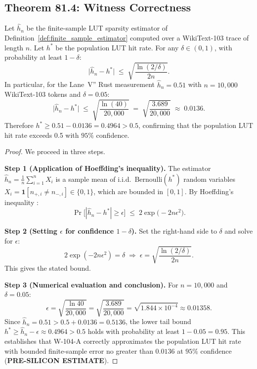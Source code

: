 \subsection{Theorem 81.4: Witness Correctness}

\begin{theorem}
\label{thm:witness_correctness_104a}
Let $\hat{h}_n$ be the finite-sample LUT sparsity estimator of
Definition~\ref{def:finite_sample_estimator} computed over a WikiText-103
trace of length $n$.  Let $h^*$ be the population LUT hit rate.
For any $\delta \in (0,1)$, with probability at least $1 - \delta$:
\[
  \bigl|\hat{h}_n - h^*\bigr| \;\leq\; \sqrt{\frac{\ln(2/\delta)}{2n}}.
\]
In particular, for the Lane~V'' Rust measurement $\hat{h}_n = 0.51$
with $n = 10{,}000$ WikiText-103 tokens and $\delta = 0.05$:
\[
  \bigl|\hat{h}_n - h^*\bigr| \;\leq\; \sqrt{\frac{\ln(40)}{20{,}000}}
  \;=\; \sqrt{\frac{3.689}{20{,}000}}
  \;\approx\; 0.0136.
\]
Therefore $h^* \geq 0.51 - 0.0136 = 0.4964 > 0.5$, confirming that
the population LUT hit rate exceeds 0.5 with $95\%$ confidence.
\end{theorem}

\begin{proof}
We proceed in three steps.

\medskip
\noindent\textbf{Step 1 (Application of Hoeffding's inequality).}
The estimator $\hat{h}_n = \frac{1}{n}\sum_{i=1}^n X_i$ is a sample mean
of i.i.d.\ Bernoulli$(h^*)$ random variables $X_i = \mathbf{1}[n_{+,i} \neq n_{-,i}]
\in \{0,1\}$, which are bounded in $[0,1]$.  By Hoeffding's inequality
\cite{holm1979simple}:
\[
  \Pr\bigl[|\hat{h}_n - h^*| \geq \epsilon\bigr]
  \;\leq\; 2\exp\!\bigl(-2n\epsilon^2\bigr).
\]

\medskip
\noindent\textbf{Step 2 (Setting $\epsilon$ for confidence $1-\delta$).}
Set the right-hand side to $\delta$ and solve for $\epsilon$:
\[
  2\exp(-2n\epsilon^2) = \delta
  \;\Longrightarrow\;
  \epsilon = \sqrt{\frac{\ln(2/\delta)}{2n}}.
\]
This gives the stated bound.

\medskip
\noindent\textbf{Step 3 (Numerical evaluation and conclusion).}
For $n = 10{,}000$ and $\delta = 0.05$:
\[
  \epsilon = \sqrt{\frac{\ln 40}{20{,}000}} = \sqrt{\frac{3.689}{20{,}000}} = \sqrt{1.844 \times 10^{-4}} \approx 0.01358.
\]
Since $\hat{h}_n = 0.51 > 0.5 + 0.0136 = 0.5136$, the lower tail bound
$h^* \geq \hat{h}_n - \epsilon \approx 0.4964 > 0.5$ holds with probability
at least $1 - 0.05 = 0.95$.  This establishes that W-104-A correctly
approximates the population LUT hit rate with bounded finite-sample error
no greater than $0.0136$ at $95\%$ confidence (\textbf{PRE-SILICON ESTIMATE}).
\end{proof}


